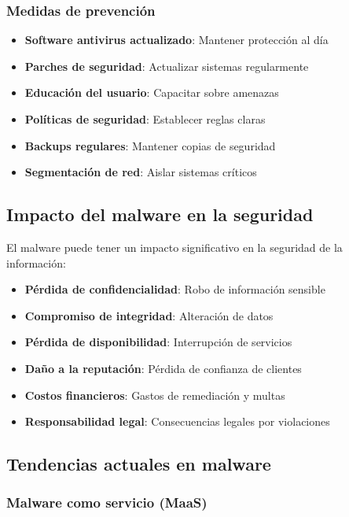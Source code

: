 \subsubsection{Medidas de prevención}

\begin{itemize}
    \item \textbf{Software antivirus actualizado}: Mantener protección al día
    \item \textbf{Parches de seguridad}: Actualizar sistemas regularmente
    \item \textbf{Educación del usuario}: Capacitar sobre amenazas
    \item \textbf{Políticas de seguridad}: Establecer reglas claras
    \item \textbf{Backups regulares}: Mantener copias de seguridad
    \item \textbf{Segmentación de red}: Aislar sistemas críticos
\end{itemize}

\subsection{Impacto del malware en la seguridad}

El malware puede tener un impacto significativo en la seguridad de la información:

\begin{itemize}
    \item \textbf{Pérdida de confidencialidad}: Robo de información sensible
    \item \textbf{Compromiso de integridad}: Alteración de datos
    \item \textbf{Pérdida de disponibilidad}: Interrupción de servicios
    \item \textbf{Daño a la reputación}: Pérdida de confianza de clientes
    \item \textbf{Costos financieros}: Gastos de remediación y multas
    \item \textbf{Responsabilidad legal}: Consecuencias legales por violaciones
\end{itemize}

\subsection{Tendencias actuales en malware}

\subsubsection{Malware como servicio (MaaS)}

